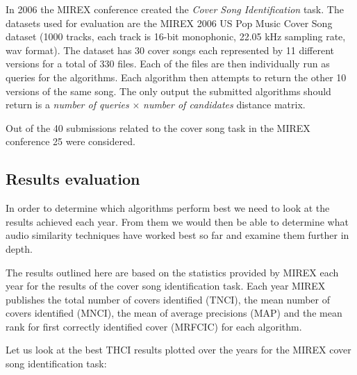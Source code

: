 In 2006 the MIREX conference created the \textit{Cover Song Identification}
task. The datasets used for evaluation are the MIREX 2006 US Pop Music Cover
Song dataset (1000 tracks, each track is 16-bit monophonic, 22.05 kHz sampling
rate, wav format). The dataset has 30 cover songs each represented by 11
different versions for a total of 330 files. Each of the files are then
individually run as queries for the algorithms. Each algorithm then attempts to
return the other 10 versions of the same song. The only output the submitted
algorithms should return is a \textit{number of queries} $\times$ \textit{number
of candidates} distance matrix. 

Out of the 40 submissions related to the cover song task in the MIREX conference
25 were considered. 

\subsection{Results evaluation}
\label{subsec:resultseval}

In order to determine which algorithms perform best we need to look at the
results achieved each year. From them we would then be able to determine what
audio similarity techniques have worked best so far and examine them further in
depth. 

The results outlined here are based on the statistics provided by MIREX each
year for the results of the cover song identification task. Each year MIREX
publishes the total number of covers identified (TNCI), the mean number of
covers identified (MNCI), the mean of average precisions (MAP) and the mean rank
for first correctly identified cover (MRFCIC) for each algorithm.

Let us look at the best THCI results plotted over the years for the MIREX cover
song identification task:

